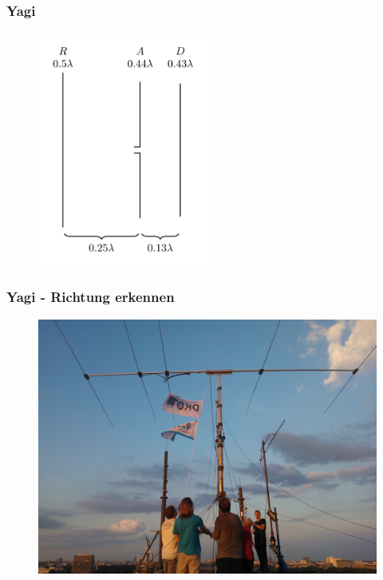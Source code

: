 \begin{frame}
  \frametitle{Yagi}
  \begin{center}
    \begin{figure}
      \includegraphics[width=0.5\textwidth,height=.75\textheight,keepaspectratio]{a09/Yagi_3_element.png}
    \end{figure}
  \end{center}
\end{frame}

\begin{frame}
  \frametitle{Yagi - Richtung erkennen}
  \begin{center}
    \begin{figure}
      \includegraphics[width=.9\textwidth,height=.75\textheight,keepaspectratio]{a09/yagi.jpg}
    \end{figure}
  \end{center}
\end{frame}

